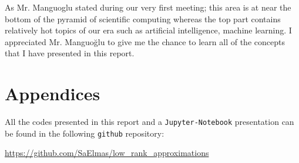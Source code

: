 \documentclass[11pt,a4paper]{article}
\theoremstyle{definition}
\begin{document}
	As Mr. Manguoglu stated during our very first meeting; this area is at near the bottom of the pyramid of scientific computing whereas the top part contains relatively hot topics of our era such as artificial intelligence, machine learning. I appreciated Mr. Manguoğlu to give me the chance to learn all of the concepts that I have presented in this report.

	\section{Appendices}
	All the codes presented in this report and a \texttt{Jupyter-Notebook} presentation can be found in the following \texttt{github} repository:

	\url{https://github.com/SaElmas/low_rank_approximations}
	
\end{document}

